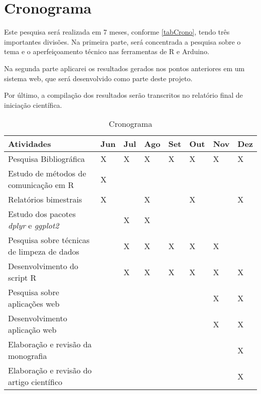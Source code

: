\chapter[Cronograma]{Cronograma}

Este pesquisa será realizada em 7 meses, conforme \autoref{tabCrono}, tendo três importantes divisões. Na 
primeira parte, será concentrada a pesquisa sobre o tema e o aperfeiçoamento 
técnico nas ferramentas de R e Arduino.

Na segunda parte aplicarei os resultados gerados nos pontos anteriores em um 
sistema web, que será desenvolvido como parte deste projeto.

Por último, a compilação dos resultados serão transcritos no relatório final de 
iniciação científica.

\begin{table}[htb]
  \centering
  \caption[Cronograma]{Cronograma}
  \label{tabCrono}
  \begin{tabular}{llllllll}
    \textbf{Atividades}                    		& \textbf{Jun} & \textbf{Jul} & \textbf{Ago} & \textbf{Set} & \textbf{Out} & \textbf{Nov} & \textbf{Dez} \\
    \hline
    Pesquisa Bibliográfica                 		& X   & X   & X   & X   & X   & X   & X   \\
    Estudo de métodos de comunicação em R  		& X   &     &     &     &     &     &     \\
    Relatórios bimestrais                  		& X   &     & X   &     & X   &     & X   \\
    Estudo dos pacotes \emph{dplyr} e \emph{ggplot2} 	&     & X   & X   &     &     &     &     \\
    Pesquisa sobre técnicas de limpeza de dados 	&     & X   & X   & X   & X   & X   &     \\
    Desenvolvimento do script R 			&     & X   & X   & X   & X   & X   & X   \\
    Pesquisa sobre aplicações web 			&     &     &     &     &     & X   & X   \\
    Desenvolvimento aplicação web 			&     &     &     &     &     & X   & X   \\
    Elaboração e revisão da monografia 			&     &     &     &     &     &     & X   \\
    Elaboração e revisão do artigo científico 		&     &     &     &     &     &     & X   \\
    \hline
  \end{tabular}
\end{table}

